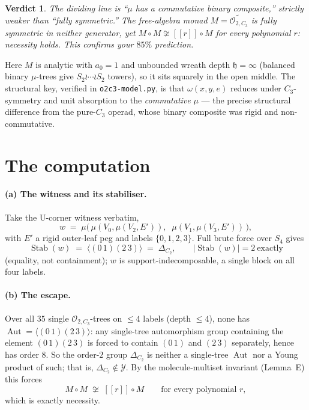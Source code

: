 \documentclass[11pt]{article}
\newtheorem*{verdict}{Verdict}
\newcommand{\Stab}{\operatorname{Stab}}
\newcommand{\Aut}{\operatorname{Aut}}
\newcommand{\bidx}[1]{[\![#1]\!]}
\newcommand{\Mcont}{M}
\newcommand{\Cthree}{C_3}
\newcommand{\Ctwo}{C_2}
\newcommand{\DeltaC}{\Delta_{\Ctwo}}
\begin{document}
\begin{verdict}
The dividing line is ``$\mu$ has a commutative binary composite,'' strictly weaker than
``fully symmetric.'' The free-algebra monad $M=\widetilde{\mathcal{O}_{2,\Cthree}}$ is fully
symmetric in \emph{neither} generator, yet $M\circ M \not\cong \bidx{r}\circ M$ for every
polynomial $r$: necessity holds. This confirms your $85\%$ prediction.
\end{verdict}

\noindent Here $M$ is analytic with $a_0=1$ and unbounded wreath depth $\mathfrak{h}=\infty$
(balanced binary $\mu$-trees give $S_2\wr\cdots\wr S_2$ towers), so it sits squarely in the
open middle. The structural key, verified in \texttt{o2c3-model.py}, is that
$\omega(x,y,e)$ reduces under $\Cthree$-symmetry and unit absorption to the \emph{commutative}
$\mu$ --- the precise structural difference from the pure-$\Cthree$ operad, whose binary
composite was rigid and non-commutative.

\section{The computation}

\paragraph{(a) The witness and its stabiliser.}
Take the U-corner witness verbatim,
\[
  w \;=\; \mu\bigl(\, \mu(V_0,\mu(V_2,E')),\;\; \mu(V_1,\mu(V_3,E')) \,\bigr),
\]
with $E'$ a rigid outer-leaf peg and labels $\{0,1,2,3\}$. Full brute force over $S_4$ gives
\[
  \Stab(w) \;=\; \langle (0\,1)(2\,3)\rangle \;=\; \DeltaC,
  \qquad |\Stab(w)| = 2 \ \text{exactly}
\]
(equality, not containment); $w$ is support-indecomposable, a single block on all four labels.

\paragraph{(b) The escape.}
Over all $35$ single $\mathcal{O}_{2,\Cthree}$-trees on $\le 4$ labels (depth $\le 4$), none has
$\Aut = \langle(0\,1)(2\,3)\rangle$: any single-tree automorphism group containing the element
$(0\,1)(2\,3)$ is forced to contain $(0\,1)$ and $(2\,3)$ separately, hence has order $8$. So the
order-$2$ group $\DeltaC$ is neither a single-tree $\Aut$ nor a Young product of such; that is,
$\DeltaC \notin \mathcal{Y}$. By the molecule-multiset invariant (Lemma~E) this forces
\[
  \Mcont\circ \Mcont \;\not\cong\; \bidx{r}\circ \Mcont
  \qquad \text{for every polynomial } r,
\]
which is exactly necessity.
\end{document}
